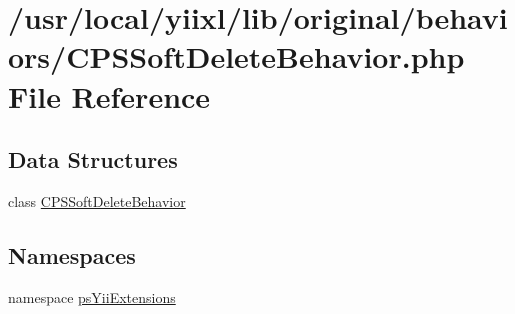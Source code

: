 \hypertarget{CPSSoftDeleteBehavior_8php}{
\section{/usr/local/yiixl/lib/original/behaviors/CPSSoftDeleteBehavior.php File Reference}
\label{CPSSoftDeleteBehavior_8php}
}
\subsection*{Data Structures}
\begin{DoxyCompactItemize}
\item 
class \hyperlink{classCPSSoftDeleteBehavior}{CPSSoftDeleteBehavior}
\end{DoxyCompactItemize}
\subsection*{Namespaces}
\begin{DoxyCompactItemize}
\item 
namespace \hyperlink{namespacepsYiiExtensions}{psYiiExtensions}
\end{DoxyCompactItemize}
